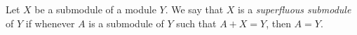 \documentclass[12pt]{article}
\begin{document}
Let $X$ be a submodule of a module $Y$.
We say that $X$ is a {\it superfluous submodule} of $Y$
if whenever $A$ is a submodule of $Y$ such that $A + X = Y$,
then $A = Y$.
\end{document}
